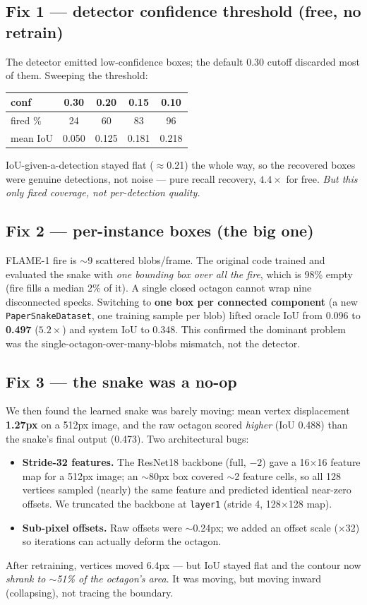 \documentclass[10pt]{article}
\begin{document}
\subsection*{Fix 1 --- detector confidence threshold (free, no retrain)}
The detector emitted low-confidence boxes; the default 0.30 cutoff discarded most
of them. Sweeping the threshold:

\begin{center}
\begin{tabular}{lcccc}
\toprule
conf & 0.30 & 0.20 & 0.15 & 0.10 \\
\midrule
fired \% & 24 & 60 & 83 & 96 \\
mean IoU & 0.050 & 0.125 & 0.181 & 0.218 \\
\bottomrule
\end{tabular}
\end{center}

IoU-given-a-detection stayed flat ($\approx$0.21) the whole way, so the recovered
boxes were genuine detections, not noise --- pure recall recovery, $4.4\times$ for
free. \emph{But this only fixed coverage, not per-detection quality.}

\subsection*{Fix 2 --- per-instance boxes (the big one)}
FLAME-1 fire is $\sim$9 scattered blobs/frame. The original code trained and
evaluated the snake with \emph{one bounding box over all the fire}, which is 98\%
empty (fire fills a median 2\% of it). A single closed octagon cannot wrap nine
disconnected specks. Switching to \textbf{one box per connected component} (a new
\texttt{PaperSnakeDataset}, one training sample per blob) lifted oracle IoU from
0.096 to \textbf{0.497} ($5.2\times$) and system IoU to 0.348. This confirmed the
dominant problem was the single-octagon-over-many-blobs mismatch, not the detector.

\subsection*{Fix 3 --- the snake was a no-op}
We then found the learned snake was barely moving: mean vertex displacement
\textbf{1.27px} on a 512px image, and the raw octagon scored \emph{higher}
(IoU 0.488) than the snake's final output (0.473). Two architectural bugs:
\begin{itemize}
\item \textbf{Stride-32 features.} The ResNet18 backbone (full, $-2$) gave a
  16$\times$16 feature map for a 512px image; an $\sim$80px box covered $\sim$2
  feature cells, so all 128 vertices sampled (nearly) the same feature and
  predicted identical near-zero offsets. We truncated the backbone at
  \texttt{layer1} (stride 4, 128$\times$128 map).
\item \textbf{Sub-pixel offsets.} Raw offsets were $\sim$0.24px; we added an
  offset scale ($\times$32) so iterations can actually deform the octagon.
\end{itemize}
After retraining, vertices moved 6.4px --- but IoU stayed flat and the contour
now \emph{shrank to $\sim$51\% of the octagon's area}. It was moving, but moving
inward (collapsing), not tracing the boundary.
\end{document}
